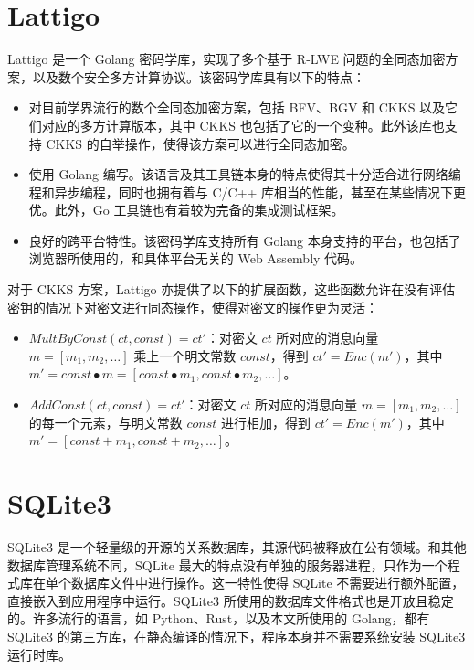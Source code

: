 \section{Lattigo}

Lattigo 是一个 Golang 密码学库，实现了多个基于 R-LWE 问题的全同态加密方案，以及数个安全多方计算协议。\cite{Mouchet2020LattigoAM,lattigoRepo}该密码学库具有以下的特点：

\begin{itemize}
    \item 对目前学界流行的数个全同态加密方案，包括 BFV、BGV 和 CKKS 以及它们对应的多方计算版本，其中 CKKS 也包括了它的一个变种\cite{cryptoeprint:2018/952}。此外该库也支持 CKKS 的自举操作，使得该方案可以进行全同态加密。
    \item 使用 Golang 编写。该语言及其工具链本身的特点使得其十分适合进行网络编程和异步编程，同时也拥有着与 C/C++ 库相当的性能，甚至在某些情况下更优。此外，Go 工具链也有着较为完备的集成测试框架。
    \item 良好的跨平台特性。该密码学库支持所有 Golang 本身支持的平台，也包括了浏览器所使用的，和具体平台无关的 Web Assembly 代码。
\end{itemize}

对于 CKKS 方案，Lattigo 亦提供了以下的扩展函数，这些函数允许在没有评估密钥的情况下对密文进行同态操作，使得对密文的操作更为灵活：

\begin{itemize}
    \item $MultByConst(ct, const) = ct'$：对密文 $ct$ 所对应的消息向量 $m = [m_1, m_2, \dots]$ 乘上一个明文常数 $const$，得到 $ct' = Enc(m')$，其中 $m' = const \bullet m  = [const \bullet m_1, const \bullet m_2, \dots]$。
    \item $AddConst(ct, const) = ct'$：对密文 $ct$ 所对应的消息向量 $m = [m_1, m_2, \dots]$ 的每一个元素，与明文常数 $const$ 进行相加，得到 $ct' = Enc(m')$，其中 $m' = [const + m_1, const + m_2, \dots]$。
\end{itemize}

\section{SQLite3}

SQLite3 是一个轻量级的开源的关系数据库，其源代码被释放在公有领域\cite{sqlite3}。和其他数据库管理系统不同，SQLite 最大的特点没有单独的服务器进程，只作为一个程式库在单个数据库文件中进行操作。这一特性使得 SQLite 不需要进行额外配置，直接嵌入到应用程序中运行。SQLite3 所使用的数据库文件格式也是开放且稳定的。许多流行的语言，如 Python、Rust，以及本文所使用的 Golang，都有 SQLite3 的第三方库，在静态编译的情况下，程序本身并不需要系统安装 SQLite3 运行时库。


